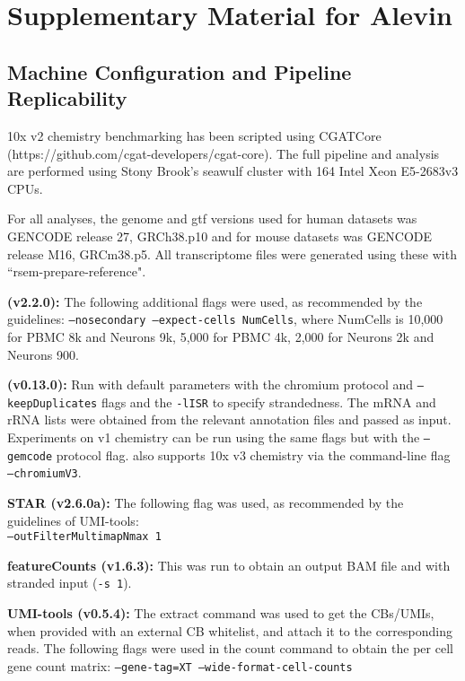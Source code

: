 \chapter{Supplementary Material for Alevin}
\label{appendix-alevin}

\section{ Machine Configuration and Pipeline Replicability }
\label{sec:tool_params}


10x v2 chemistry benchmarking has been scripted using CGATCore (https://github.com/cgat-developers/cgat-core). The full pipeline and analysis are performed using Stony Brook's seawulf cluster with 164 Intel Xeon E5-2683v3 CPUs.

For all analyses, the genome and gtf versions used for human datasets was GENCODE release 27, GRCh38.p10 and for mouse datasets was GENCODE release M16, GRCm38.p5. All transcriptome files were generated using these with ``rsem-prepare-reference".

\textbf{\cellr (v2.2.0):} The following additional flags were used, as recommended by the \cellr guidelines: \texttt{--nosecondary --expect-cells NumCells}, where NumCells is 10,000 for PBMC 8k and Neurons 9k,
5,000 for PBMC 4k, 2,000 for Neurons 2k and Neurons 900.

\textbf{\Alevin (v0.13.0):} Run with default parameters with the chromium protocol and \texttt{--keepDuplicates} flags and the \texttt{-lISR} to specify strandedness. The mRNA and rRNA lists were obtained from the relevant annotation files and passed as input. Experiments on v1 chemistry can be run using the same flags but with the \texttt{--gemcode} protocol flag.  \Alevin also supports 10x v3 chemistry via the command-line flag \texttt{--chromiumV3}.

\textbf{STAR (v2.6.0a):} The following flag was used, as recommended by the guidelines of UMI-tools: \\ \texttt{--outFilterMultimapNmax 1} 

\textbf{featureCounts (v1.6.3):} This was run to obtain an output BAM file and with stranded input (\texttt{-s 1}).

\textbf{UMI-tools (v0.5.4):} The extract command was used to get the CBs/UMIs, when provided with an external CB whitelist, and attach it to the corresponding reads. The following flags were used in the count command to obtain the per cell gene count matrix: \texttt{--gene-tag=XT --wide-format-cell-counts}

